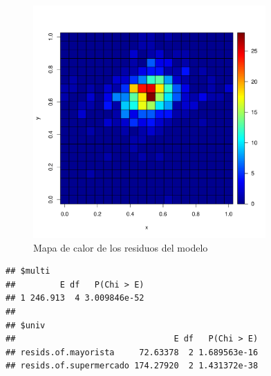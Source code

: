 \documentclass[12pt, twoside]{book}\usepackage[]{graphicx}\usepackage[]{color}
\makeatletter
\newenvironment{kframe}{%
 \def\at@end@of@kframe{}%
 \ifinner\ifhmode%
  \def\at@end@of@kframe{\end{minipage}}%
  \begin{minipage}{\columnwidth}%
 \fi\fi%
 \def\FrameCommand##1{\hskip\@totalleftmargin \hskip-\fboxsep
 \colorbox{shadecolor}{##1}\hskip-\fboxsep
     \hskip-\linewidth \hskip-\@totalleftmargin \hskip\columnwidth}%
 \MakeFramed {\advance\hsize-\width
   \@totalleftmargin\z@ \linewidth\hsize
   \@setminipage}}%
 {\par\unskip\endMakeFramed%
 \at@end@of@kframe}
\newenvironment{knitrout}{}{} %
\numberwithin{equation}{section}
\numberwithin{theorem}{section}
\numberwithin{teorema}{section}
\numberwithin{defi}{section}
\numberwithin{prop}{section}
\numberwithin{defi}{section}
\theoremstyle{plain}
\makeatother
\begin{document}
\begin{knitrout}
\color{fgcolor}\begin{figure}[H]

{\centering \includegraphics[width=3.5in,height=3.5in]{figure/fig-5_12-1} 

}

\caption[Mapa de calor de los residuos del modelo]{Mapa de calor de los residuos del modelo}\label{fig:fig-5.12}
\end{figure}


\end{knitrout}


\begin{knitrout}
\color{fgcolor}\begin{kframe}


{\ttfamily\noindent\bfseries\color{errorcolor}{\#\# Error in residuals(mono\_rest): objeto 'mono\_rest' no encontrado}}\begin{verbatim}
## $multi
##         E df   P(Chi > E)
## 1 246.913  4 3.009846e-52
## 
## $univ
##                                E df   P(Chi > E)
## resids.of.mayorista     72.63378  2 1.689563e-16
## resids.of.supermercado 174.27920  2 1.431372e-38
\end{verbatim}


{\ttfamily\noindent\bfseries\color{errorcolor}{\#\# Error in residuals(mono\_rest): objeto 'mono\_rest' no encontrado}}

{\ttfamily\noindent\bfseries\color{errorcolor}{\#\# Error in residuals(mono\_rest): objeto 'mono\_rest' no encontrado}}\end{kframe}
\end{knitrout}
\end{document}
